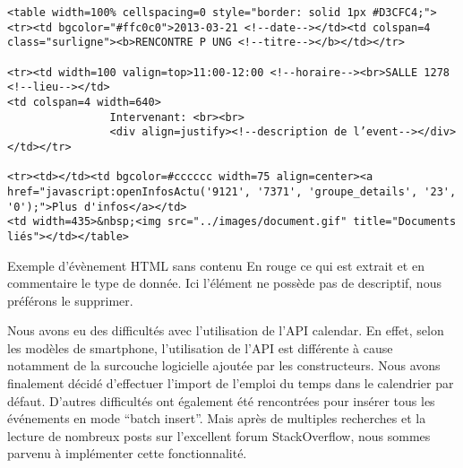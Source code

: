\begin{adjustbox}{minipage=1.14\textwidth,margin=0pt \smallskipamount,center}
\begin{lstlisting}[style=HTML, label=htmlCode]
<table width=100% cellspacing=0 style="border: solid 1px #D3CFC4;"><tr><td bgcolor="#ffc0c0">2013-03-21 <!--date--></td><td colspan=4 class="surligne"><b>RENCONTRE P UNG <!--titre--></b></td></tr>

<tr><td width=100 valign=top>11:00-12:00 <!--horaire--><br>SALLE 1278 <!--lieu--></td>
<td colspan=4 width=640>
	            Intervenant: <br><br>
				<div align=justify><!--description de l’event--></div></td></tr>

<tr><td></td><td bgcolor=#cccccc width=75 align=center><a href="javascript:openInfosActu('9121', '7371', 'groupe_details', '23', '0');">Plus d'infos</a></td>
<td width=435>&nbsp;<img src="../images/document.gif" title="Documents liés"></td></table>
\end{lstlisting}
\end{adjustbox}
Exemple d'évènement HTML sans contenu
En rouge ce qui est extrait et en commentaire le type de donnée. Ici l’élément ne possède pas de descriptif, nous préférons le supprimer.

Nous avons eu des difficultés avec l’utilisation de l’API calendar. En effet, selon les modèles de smartphone, l’utilisation de l’API est différente à cause notamment de la surcouche logicielle ajoutée par les constructeurs. Nous avons finalement décidé d’effectuer l’import de l’emploi du temps dans le calendrier par défaut. D’autres difficultés ont également été rencontrées pour insérer tous les événements en mode “batch insert”. Mais après de multiples recherches et la lecture de nombreux posts sur l’excellent forum StackOverflow, nous sommes parvenu à implémenter cette fonctionnalité.


